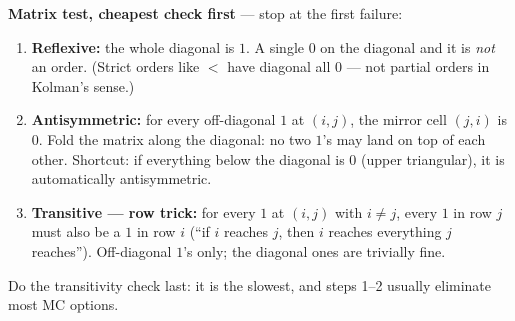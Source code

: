 \documentclass{fkt-notes}
\theoremstyle{definition}
\begin{document}
\begin{rulepar}
  \textbf{Matrix test, cheapest check first} --- stop at the first failure:
  \begin{enumerate}[nosep]
    \item \textbf{Reflexive:} the whole diagonal is $1$. A single $0$ on
          the diagonal and it is \emph{not} an order. (Strict orders like
          $<$ have diagonal all $0$ --- not partial orders in Kolman's
          sense.)
    \item \textbf{Antisymmetric:} for every off-diagonal $1$ at
          $(i,j)$, the mirror cell $(j,i)$ is $0$. Fold the matrix along
          the diagonal: no two $1$'s may land on top of each other.
          Shortcut: if everything below the diagonal is $0$ (upper
          triangular), it is automatically antisymmetric.
    \item \textbf{Transitive --- row trick:} for every $1$ at $(i,j)$
          with $i \ne j$, every $1$ in row $j$ must also be a $1$ in row
          $i$ (``if $i$ reaches $j$, then $i$ reaches everything $j$
          reaches''). Off-diagonal $1$'s only; the diagonal ones are
          trivially fine.
  \end{enumerate}
  Do the transitivity check last: it is the slowest, and steps 1--2
  usually eliminate most MC options.
\end{rulepar}
\end{document}
